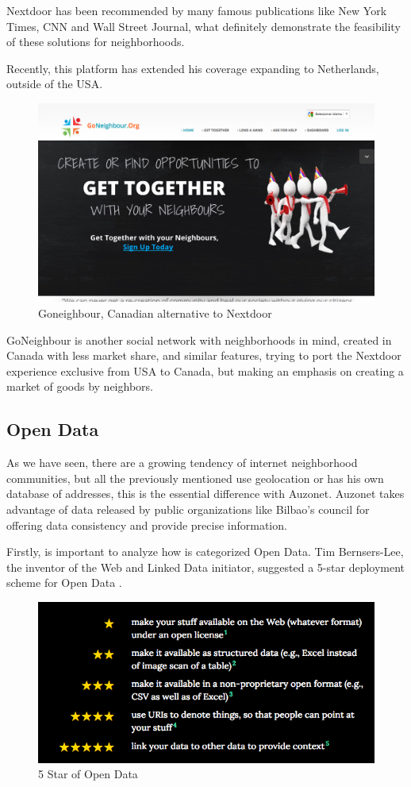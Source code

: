 \documentclass{DeustoFDP}
\begin{document}
Nextdoor has been recommended by many famous publications like New York Times, CNN and Wall Street Journal, what definitely demonstrate the feasibility of these solutions for neighborhoods.

Recently, this platform has extended his coverage expanding to Netherlands, outside of the USA.

\begin{figure}[H]
\centering
\includegraphics[width=0.7\linewidth]{fig/goneighbor}
\caption[Goneighbour]{Goneighbour, Canadian alternative to Nextdoor}
\label{fig:goneighbor}
\end{figure}

GoNeighbour is another social network with neighborhoods in mind, created in Canada with less market share, and similar features, trying to port the Nextdoor experience exclusive from USA to Canada, but making an emphasis on creating a market of goods by neighbors.

\subsection{Open Data}
As we have seen, there are a growing tendency of internet neighborhood communities, but all the previously mentioned use geolocation or has his own database of addresses, this is the essential difference with Auzonet. Auzonet takes advantage of data released by public organizations like Bilbao's council for offering data consistency and provide precise information.

Firstly, is important to analyze how is categorized Open Data. Tim Bernsers-Lee, the inventor of the Web and Linked Data initiator, suggested a 5-star deployment scheme for Open Data \cite{ODStars}.

\begin{figure}[h]
\centering
\includegraphics[width=0.7\linewidth]{fig/5starod}
\caption[5 Star of Open Data]{5 Star of Open Data}
\label{fig:5starod}
\end{figure}
\end{document}
